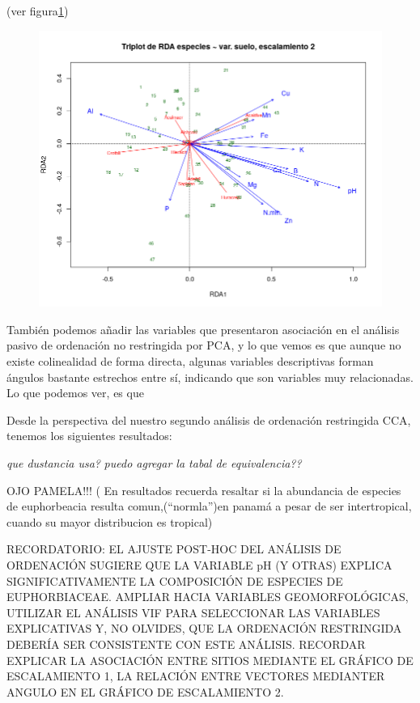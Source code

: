 \documentclass[11pt,]{article}
\begin{document}
(ver figura\ref{fig:RDA})

\begin{figure}
\centering
\includegraphics{RDA.png}
\caption{\label{fig:RDA}}
\end{figure}

También podemos añadir las variables que presentaron asociación en el
análisis pasivo de ordenación no restringida por PCA, y lo que vemos es
que aunque no existe colinealidad de forma directa, algunas variables
descriptivas forman ángulos bastante estrechos entre sí, indicando que
son variables muy relacionadas. Lo que podemos ver, es que

Desde la perspectiva del nuestro segundo análisis de ordenación
restringida CCA, tenemos los siguientes resultados:

\emph{que dustancia usa?} \emph{puedo agregar la tabal de
equivalencia??}

OJO PAMELA!!! ( En resultados recuerda resaltar si la abundancia de
especies de euphorbeacia resulta comun,(``normla'')en panamá a pesar de
ser intertropical, cuando su mayor distribucion es tropical)

RECORDATORIO: EL AJUSTE POST-HOC DEL ANÁLISIS DE ORDENACIÓN SUGIERE QUE
LA VARIABLE pH (Y OTRAS) EXPLICA SIGNIFICATIVAMENTE LA COMPOSICIÓN DE
ESPECIES DE EUPHORBIACEAE. AMPLIAR HACIA VARIABLES GEOMORFOLÓGICAS,
UTILIZAR EL ANÁLISIS VIF PARA SELECCIONAR LAS VARIABLES EXPLICATIVAS Y,
NO OLVIDES, QUE LA ORDENACIÓN RESTRINGIDA DEBERÍA SER CONSISTENTE CON
ESTE ANÁLISIS. RECORDAR EXPLICAR LA ASOCIACIÓN ENTRE SITIOS MEDIANTE EL
GRÁFICO DE ESCALAMIENTO 1, LA RELACIÓN ENTRE VECTORES MEDIANTER ANGULO
EN EL GRÁFICO DE ESCALAMIENTO 2.
\end{document}
